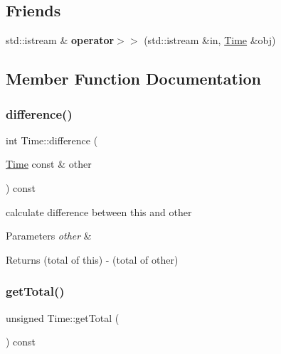 \subsection*{Friends}
\begin{DoxyCompactItemize}
\item 
\mbox{\label{classTime_ae4ac864187eab9a6a954dd4213ec49fa}} 
std\+::istream \& {\bfseries operator$>$$>$} (std\+::istream \&in, \hyperlink{classTime}{Time} \&obj)
\end{DoxyCompactItemize}


\subsection{Member Function Documentation}
\mbox{\label{classTime_af02e08b3bf203d9cedbf9f629cddcc1f}} 
\subsubsection{\texorpdfstring{difference()}{difference()}}
{\footnotesize\ttfamily int Time\+::difference (\begin{DoxyParamCaption}\item[{\hyperlink{classTime}{Time} const \&}]{other }\end{DoxyParamCaption}) const}

calculate difference between this and other 
\begin{DoxyParams}{Parameters}
{\em other} & \\
\hline
\end{DoxyParams}
\begin{DoxyReturn}{Returns}
(total of this) -\/ (total of other) 
\end{DoxyReturn}
\mbox{\label{classTime_ac64625b85a2497986774edcc8dde50e9}} 
\subsubsection{\texorpdfstring{get\+Total()}{getTotal()}}
{\footnotesize\ttfamily unsigned Time\+::get\+Total (\begin{DoxyParamCaption}{ }\end{DoxyParamCaption}) const}

